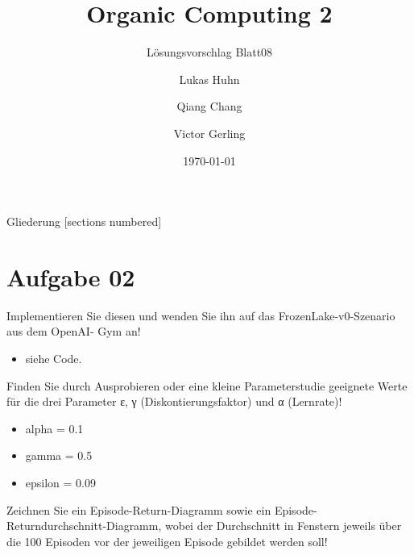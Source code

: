 \documentclass{ocbeameruni}
\title{Organic Computing 2}
\subtitle{Lösungsvorschlag Blatt08}
\date{\today}
\author{Lukas Huhn \and Qiang Chang \and Victor Gerling}
\institute{%
  Universität Augsburg\\
  Institut für Informatik\\
  Lehrstuhl für Organic Computing
}
\begin{document}
\maketitle


\begin{frame}{Gliederung}
  [sections numbered]
  \tableofcontents
\end{frame}


\section{Aufgabe 02}

\begin{frame}{2.1}
Implementieren Sie diesen und wenden Sie ihn auf das FrozenLake-v0-Szenario aus dem OpenAI-
Gym an!
    \begin{itemize}
    \item siehe Code.
    \end{itemize}
\end{frame}

\begin{frame}{2.2}
Finden Sie durch Ausprobieren oder eine kleine Parameterstudie geeignete Werte für die drei
Parameter ε, γ (Diskontierungsfaktor) und α (Lernrate)!
    \begin{itemize}
    \item alpha = 0.1
    \item gamma = 0.5
    \item epsilon = 0.09
    \end{itemize}
\end{frame}

\begin{frame}{2.2}
Zeichnen Sie ein Episode-Return-Diagramm sowie ein Episode-Returndurchschnitt-Diagramm,
wobei der Durchschnitt in Fenstern jeweils über die 100 Episoden vor der jeweiligen Episode
gebildet werden soll!
\end{frame}
\end{document}
